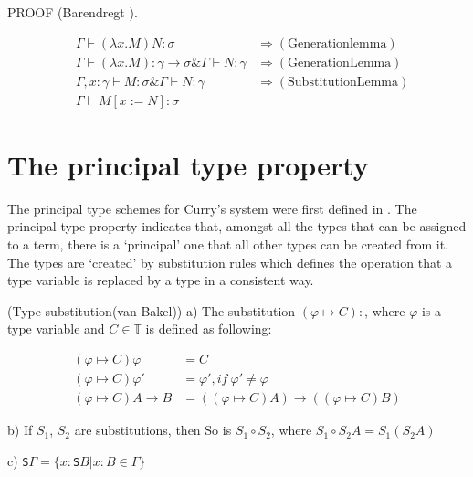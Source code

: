 \noindent PROOF (Barendregt \cite{barendregt1984introduction}).

\begin{align*}
   &\Gamma \vdash (\lambda x.M)N:\sigma & \Rightarrow \mathrm{(Generation lemma)}\\
   &\Gamma \vdash (\lambda x.M):\gamma \rightarrow \sigma \& \Gamma \vdash N:\gamma &  \Rightarrow \mathrm{(Generation Lemma)}\\
   &\Gamma ,x:\gamma \vdash M:\sigma \& \Gamma \vdash N:\gamma & \Rightarrow \mathrm{ (Substitution Lemma)}\\
   &\Gamma \vdash M[x:=N]:\sigma
\end{align*} 



\section{The principal type property}

The principal type schemes for Curry's system were first defined in \cite{hindley1969principal}. The principal type property indicates that, amongst all the types that can be assigned to a term, there is a `principal' one that all other types can be created from it. The types are `created' by substitution rules which defines the operation that a type variable is replaced by a type in a consistent way.


\begin{def1}{\label{def:tsub}}
\normalfont (Type substitution(van Bakel\cite{svb2001type})) a) The substitution $(\varphi \mapsto C): $, where $\varphi$ is a type variable and $C \in \mathbb{T}$ is defined as following:
\end{def1}

\begin{equation*}
\begin{array}{ll}
(\varphi \mapsto C)\varphi        & = C\\
(\varphi \mapsto C)\varphi '      & = \varphi ',if\ \varphi '\neq \varphi\\
(\varphi \mapsto C)A\rightarrow B & = ((\varphi \mapsto C)A)\rightarrow ((\varphi \mapsto C)B)
\end{array}
\end{equation*}

b) If $S_1$, $S_2$ are substitutions, then So is $S_1\circ S_2$, where $S_1\circ S_2A=S_1(S_2A)$

c) \texttt{S}$\Gamma = \{x:$\texttt{S}$B | x:B \in \Gamma\}$

